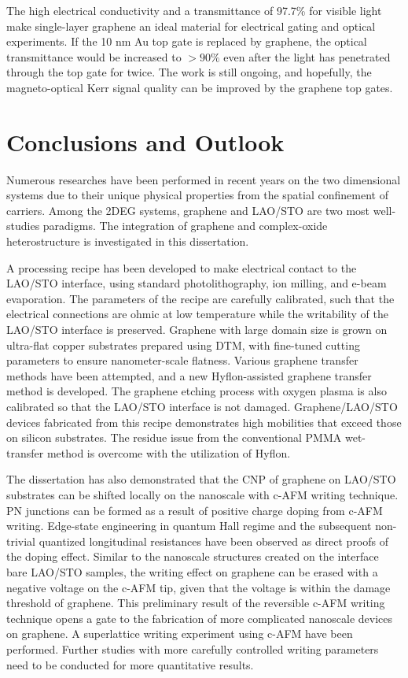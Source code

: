 \documentclass[pdflatex, sectionletters, 12pt]{pittetd}    %
\begin{document}
The high electrical conductivity and a transmittance of 97.7\% for visible light\cite{nair2008fine} make single-layer graphene an ideal material for electrical gating and optical experiments. If the 10 nm Au top gate is replaced by graphene, the optical transmittance would be increased to $> 90\%$ even after the light has penetrated through the top gate for twice. The work is still ongoing, and hopefully, the magneto-optical Kerr signal quality can be improved by the graphene top gates.

\chapter{Conclusions and Outlook}

Numerous researches have been performed in recent years on the two dimensional systems due to their unique physical properties from the spatial confinement of carriers. Among the 2DEG systems, graphene and LAO/STO are two most well-studies paradigms. The integration of graphene and complex-oxide heterostructure is investigated in this dissertation. 

A processing recipe has been developed to make electrical contact to the LAO/STO interface, using standard photolithography, ion milling, and e-beam evaporation. The parameters of the recipe are carefully calibrated, such that the electrical connections are ohmic at low temperature while the writability of the LAO/STO interface is preserved. Graphene with large domain size is grown on ultra-flat copper substrates prepared using DTM, with fine-tuned cutting parameters to ensure nanometer-scale flatness. Various graphene transfer methods have been attempted, and a new Hyflon-assisted graphene transfer method is developed. The graphene etching process with oxygen plasma is also calibrated so that the LAO/STO interface is not damaged. Graphene/LAO/STO devices fabricated from this recipe demonstrates high mobilities that exceed those on silicon substrates. The residue issue from the conventional PMMA wet-transfer method is overcome with the utilization of Hyflon.

The dissertation has also demonstrated that the CNP of graphene on LAO/STO substrates can be shifted locally on the nanoscale with c-AFM writing technique. PN junctions can be formed as a result of positive charge doping from c-AFM writing. Edge-state engineering in quantum Hall regime and the subsequent non-trivial quantized longitudinal resistances have been observed as direct proofs of the doping effect. Similar to the nanoscale structures created on the interface bare LAO/STO samples, the writing effect on graphene can be erased with a negative voltage on the c-AFM tip, given that the voltage is within the damage threshold of graphene. This preliminary result of the reversible c-AFM writing technique opens a gate to the fabrication of more complicated nanoscale devices on graphene. A superlattice writing experiment using c-AFM have been performed. Further studies with more carefully controlled writing parameters need to be conducted for more quantitative results.
\end{document}
